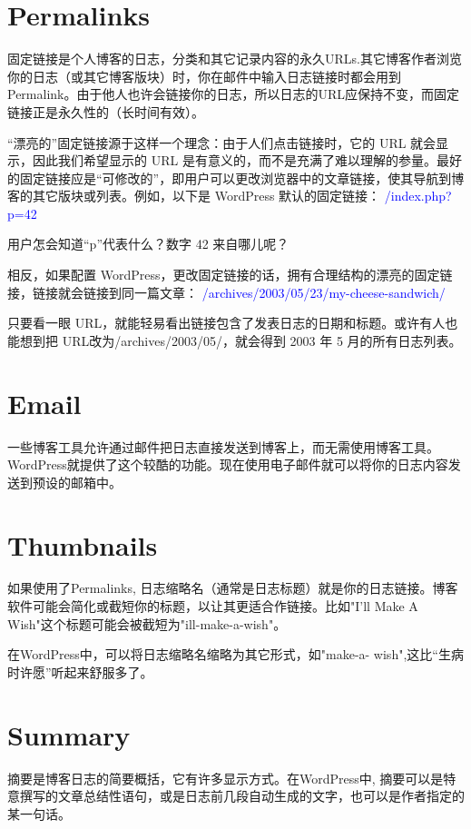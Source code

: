 \section{Permalinks}


固定链接是个人博客的日志，分类和其它记录内容的永久URLs.其它博客作者浏览你的日志（或其它博客版块）时，你在邮件中输入日志链接时都会用到Permalink。由于他人也许会链接你的日志，所以日志的URL应保持不变，而固定链接正是永久性的（长时间有效）。

“漂亮的”固定链接源于这样一个理念：由于人们点击链接时，它的 URL 就会显示，因此我们希望显示的 URL 是有意义的，而不是充满了难以理解的参量。最好的固定链接应是“可修改的”，即用户可以更改浏览器中的文章链接，使其导航到博客的其它版块或列表。例如，以下是 WordPress 默认的固定链接： \textcolor{Blue}{/index.php?p=42}

用户怎会知道“p”代表什么？数字 42 来自哪儿呢？

相反，如果配置 WordPress，更改固定链接的话，拥有合理结构的漂亮的固定链接，链接就会链接到同一篇文章： \textcolor{Blue}{/archives/2003/05/23/my-cheese-sandwich/}

只要看一眼 URL，就能轻易看出链接包含了发表日志的日期和标题。或许有人也能想到把 URL改为/archives/2003/05/，就会得到 2003 年 5 月的所有日志列表。

\section{Email}

一些博客工具允许通过邮件把日志直接发送到博客上，而无需使用博客工具。WordPress就提供了这个较酷的功能。现在使用电子邮件就可以将你的日志内容发送到预设的邮箱中。

\section{Thumbnails}


如果使用了Permalinks, 日志缩略名（通常是日志标题）就是你的日志链接。博客软件可能会简化或截短你的标题，以让其更适合作链接。比如"I'll Make A Wish"这个标题可能会被截短为"ill-make-a-wish"。

在WordPress中，可以将日志缩略名缩略为其它形式，如"make-a- wish",这比“生病时许愿”听起来舒服多了。

\section{Summary}


摘要是博客日志的简要概括，它有许多显示方式。在WordPress中, 摘要可以是特意撰写的文章总结性语句，或是日志前几段自动生成的文字，也可以是作者指定的某一句话。

